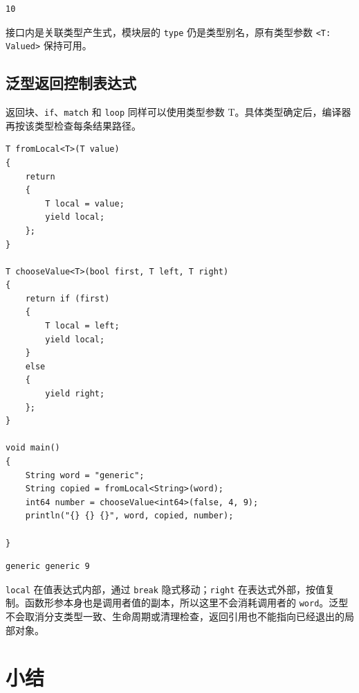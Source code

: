 \par
\medskip
\begin{lstlisting}[style=out]
10
\end{lstlisting}
\par
\medskip

接口内是关联类型产生式，模块层的 \texttt{type} 仍是类型别名，原有类型参数 \texttt{<\allowbreak{}T:\allowbreak{} Valued>\allowbreak{}} 保持可用。

\subsection*{泛型返回控制表达式}

返回块、\texttt{if}、\texttt{match} 和 \texttt{loop} 同样可以使用类型参数 T。具体类型确定后，编译器再按该类型检查每条结果路径。

\par
\medskip
\begin{lstlisting}[style=chali]
T fromLocal<T>(T value)
{
    return
    {
        T local = value;
        yield local;
    };
}

T chooseValue<T>(bool first, T left, T right)
{
    return if (first)
    {
        T local = left;
        yield local;
    }
    else
    {
        yield right;
    };
}

void main()
{
    String word = "generic";
    String copied = fromLocal<String>(word);
    int64 number = chooseValue<int64>(false, 4, 9);
    println("{} {} {}", word, copied, number);

}
\end{lstlisting}
\par
\medskip

\par
\medskip
\begin{lstlisting}[style=out]
generic generic 9
\end{lstlisting}
\par
\medskip

\texttt{local} 在值表达式内部，通过 \texttt{break} 隐式移动；\texttt{right} 在表达式外部，按值复制。函数形参本身也是调用者值的副本，所以这里不会消耗调用者的 \texttt{word}。泛型不会取消分支类型一致、生命周期或清理检查，返回引用也不能指向已经退出的局部对象。

\section{小结}

